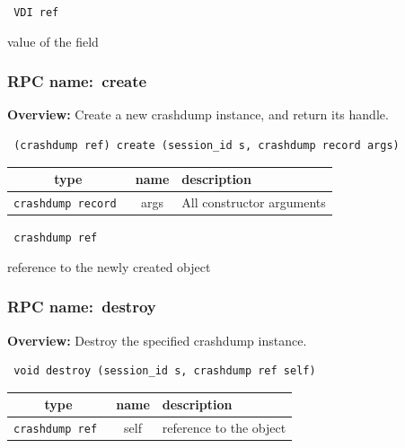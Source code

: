 {\tt 
VDI ref
}


value of the field
\vspace{0.3cm}
\vspace{0.3cm}
\vspace{0.3cm}
\subsubsection{RPC name:~create}

{\bf Overview:} 
Create a new crashdump instance, and return its handle.

\begin{verbatim} (crashdump ref) create (session_id s, crashdump record args)\end{verbatim}



 
\vspace{0.3cm}
\begin{tabular}{|c|c|p{7cm}|}
 \hline
{\bf type} & {\bf name} & {\bf description} \\ \hline
{\tt crashdump record } & args & All constructor arguments \\ \hline 

\end{tabular}

\vspace{0.3cm}

{\tt 
crashdump ref
}


reference to the newly created object
\vspace{0.3cm}
\vspace{0.3cm}
\vspace{0.3cm}
\subsubsection{RPC name:~destroy}

{\bf Overview:} 
Destroy the specified crashdump instance.

\begin{verbatim} void destroy (session_id s, crashdump ref self)\end{verbatim}



 
\vspace{0.3cm}
\begin{tabular}{|c|c|p{7cm}|}
 \hline
{\bf type} & {\bf name} & {\bf description} \\ \hline
{\tt crashdump ref } & self & reference to the object \\ \hline 

\end{tabular}

